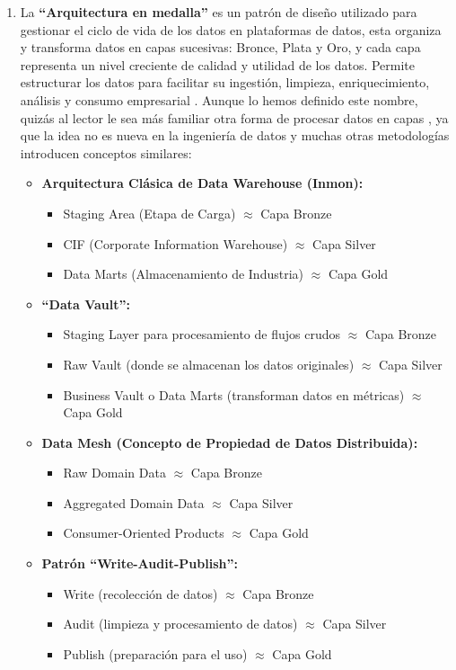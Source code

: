 \begin{enumerate}
		\item La \textbf{``Arquitectura en medalla''} \label{def11} es un patrón de diseño utilizado para gestionar el ciclo de vida de los datos en plataformas de datos, esta organiza y transforma datos en capas sucesivas: Bronce, Plata y Oro, y cada capa representa un nivel creciente de calidad y utilidad de los datos. Permite estructurar los datos para facilitar su ingestión, limpieza, enriquecimiento, análisis y consumo empresarial \citep{MedallionMicrosoft}. 
		Aunque lo hemos definido este nombre, quizás al lector le sea más familiar otra forma de procesar datos en capas \citep{MedallionMedium}, ya que la idea no es nueva en la ingeniería de datos y muchas otras metodologías introducen conceptos similares:
		\begin{itemize}
			\item \textbf{Arquitectura Clásica de Data Warehouse (Inmon):}
			\begin{itemize}
				\item Staging Area (Etapa de Carga) $\approx$ Capa Bronze
				\item CIF (Corporate Information Warehouse) $\approx$ Capa Silver
				\item Data Marts (Almacenamiento de Industria) $\approx$ Capa Gold
			\end{itemize}
			\item \textbf{``Data Vault'':}
			\begin{itemize}
				\item Staging Layer para procesamiento de flujos crudos $\approx$ Capa Bronze
				\item Raw Vault (donde se almacenan los datos originales) $\approx$ Capa Silver
				\item Business Vault o Data Marts (transforman datos en métricas) $\approx$ Capa Gold
			\end{itemize}
			\item \textbf{Data Mesh (Concepto de Propiedad de Datos Distribuida):}
			\begin{itemize}
				\item Raw Domain Data $\approx$ Capa Bronze
				\item Aggregated Domain Data $\approx$ Capa Silver
				\item Consumer-Oriented Products $\approx$ Capa Gold
			\end{itemize}
			\item \textbf{Patrón ``Write-Audit-Publish'':}
			\begin{itemize}
				\item Write (recolección de datos) $\approx$ Capa Bronze
				\item Audit (limpieza y procesamiento de datos) $\approx$ Capa Silver
				\item Publish (preparación para el uso) $\approx$ Capa Gold
			\end{itemize}
		\end{itemize}
		

\end{enumerate}
